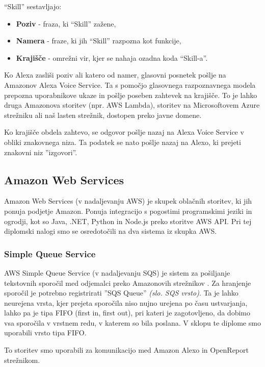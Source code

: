 \documentclass[a4paper, 12pt]{book}
\begin{document}
\noindent \enquote{Skill} sestavljajo:
\begin{itemize}
	\item \textbf{Poziv} - fraza, ki \enquote{Skill} zažene,
	\item \textbf{Namera} - fraze, ki jih \enquote{Skill} razpozna kot funkcije,
	\item \textbf{Krajišče} - omrežni vir, kjer se nahaja ozadna koda \enquote{Skill-a}.
\end{itemize}



Ko Alexa zasliši poziv ali katero od namer, glasovni posnetek pošlje na Amazonov Alexa Voice Service.
Ta s pomočjo glasovnega razpoznavnega modela prepozna uporabnikove ukaze in pošlje poseben zahtevek na krajišče.
To je lahko druga Amazonova storitev (npr. AWS Lambda), storitev na Microsoftovem Azure strežniku ali naš lasten strežnik, dostopen preko javne domene.

Ko krajišče obdela zahtevo, se odgovor pošlje nazaj na Alexa Voice Service v obliki znakovnega niza.
Ta podatek se nato pošlje nazaj na Alexo, ki prejeti znakovni niz ''izgovori''.

\subsection{Amazon Web Services}

Amazon Web Services (v nadaljevanju AWS) je skupek oblačnih storitev, ki jih ponuja podjetje Amazon.
Ponuja integracijo s pogostimi programskimi jeziki in ogrodji, kot so Java, .NET, Python in Node.js preko storitve AWS API.
Pri tej diplomski nalogi smo se osredotočili na dva sistema iz skupka AWS.

\subsubsection{Simple Queue Service}

AWS Simple Queue Service (v nadaljevanju SQS) je sistem za pošiljanje tekstovnih sporočil med odjemalci preko Amazonovih strežnikov \cite{sqs}.
Za hranjenje sporočil je potrebno registrirati ''SQS Queue'' \textit{(slo. SQS vrsto)}. 
Ta je lahko neurejena vrsta, kjer prejeta sporočila niso nujno urejena po času ustvarjanja, lahko pa je tipa FIFO (first in, first out), pri kateri je zagotovljeno, da dobimo vsa sporočila v vrstnem redu, v katerem so bila poslana.
V sklopu te diplome smo uporabili vrsto tipa FIFO.

To storitev smo uporabili za komunikacijo med Amazon Alexo in OpenReport strežnikom.
\end{document}
